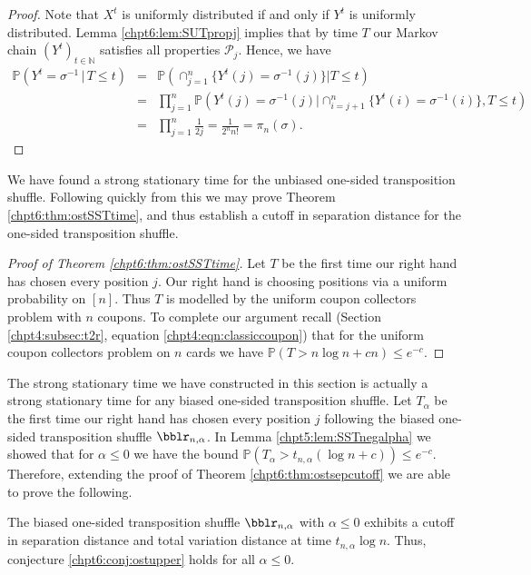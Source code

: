 \documentclass[11pt]{report}
\begin{document}
\begin{proof}
	Note that $X^{t}$ is uniformly distributed if and only if $Y^{t}$ is uniformly distributed.
	Lemma \ref{chpt6:lem:SUTpropj} implies that by time $T$ our Markov chain $(Y^{t})_{t \in \mathbb{N}}$ satisfies all properties $\mathcal{P}_{j}$. Hence, we have
	\begin{eqnarray*}
		\mathbb{P}(Y^{t} = \sigma^{-1} \, | \, T\leq t) & = &\mathbb{P}\left(
		\cap_{j=1}^{n} \{Y^{t}(j) = \sigma^{-1}(j) \} | T\leq t\right)\\  
		& = & \prod_{j=1}^{n}\mathbb{P}\left(  Y^{t}(j) = \sigma^{-1}(j) | 
		\cap_{i=j+1}^{n} \{
		Y^{t}(i) = \sigma^{-1}(i) \}, T\leq t\right)\\
		& = & 	\prod_{j=1}^{n} \frac{1}{2j} = \frac{1}{2^{n}n!} = \pi_{n}(\sigma).
	\end{eqnarray*}
\end{proof}

We have found a strong stationary time for the unbiased one-sided transposition shuffle. Following quickly from this we may prove Theorem \ref{chpt6:thm:ostSSTtime}, and thus establish a cutoff in separation distance for the one-sided transposition shuffle. 

\begin{proof}[Proof of Theorem \ref{chpt6:thm:ostSSTtime}]
	Let $T$ be the first time our right hand has chosen every position 
	$j$. 
	Our right hand is choosing positions via a uniform probability on 
	$[n]$. Thus $T$ is modelled by the uniform coupon collectors problem with $n$ 	coupons. To complete our argument recall (Section \ref{chpt4:subsec:t2r}, equation \eqref{chpt4:eqn:classiccoupon})  that for the uniform coupon collectors problem on $n$ cards we have $\mathbb{P}(T >n\log n +cn) \leq e^{-c}$. 
\end{proof} 

The strong stationary time we have constructed in this section is actually a strong stationary time for any biased one-sided transposition shuffle. Let $T_{\alpha}$ be the first time our right hand has chosen every position $j$ following the biased one-sided transposition shuffle $\bblr_{n,\alpha}$. In Lemma \ref{chpt5:lem:SSTnegalpha} we showed that for $\alpha \leq 0$ we have the bound $\mathbb{P}(T_{\alpha} > t_{n,\alpha}(\log n + c)) \leq e^{-c}$. Therefore, extending the proof of Theorem \ref{chpt6:thm:ostsepcutoff} we are able to prove the following.

\begin{corollary}
	\label{chpt6:thm:biasedsepcutoff}
	The biased one-sided transposition shuffle $\bblr_{n,\alpha}$ with $\alpha\leq 0$ exhibits a cutoff in separation distance and total variation distance at time $t_{n,\alpha} \log n$.	
	Thus, conjecture \ref{chpt6:conj:ostupper} holds for all $\alpha \leq 0$.
\end{corollary}
\end{document}
